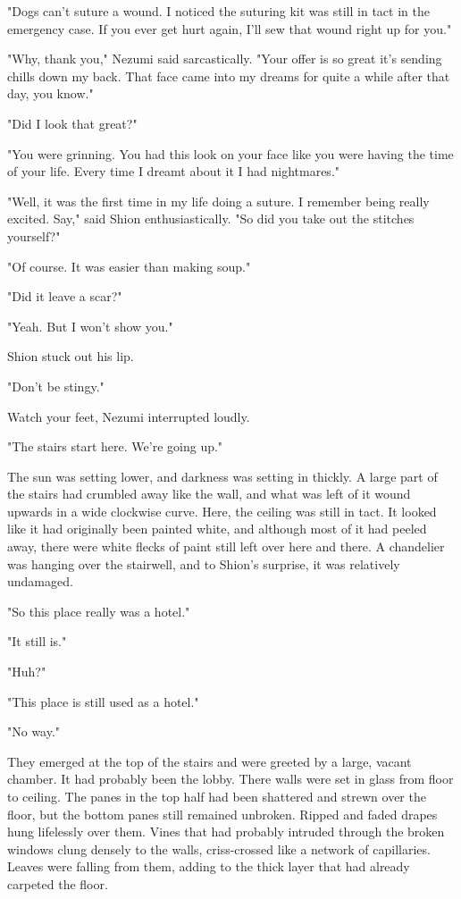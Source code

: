 "Dogs can't suture a wound. I noticed the suturing kit was still in tact
in the emergency case. If you ever get hurt again, I'll sew that wound
right up for you."

"Why, thank you," Nezumi said sarcastically. "Your offer is so great
it's sending chills down my back. That face came into my dreams for
quite a while after that day, you know."

"Did I look that great?"

"You were grinning. You had this look on your face like you were having
the time of your life. Every time I dreamt about it I had nightmares."

"Well, it was the first time in my life doing a suture. I remember being
really excited. Say," said Shion enthusiastically. "So did you take out
the stitches yourself?"

"Of course. It was easier than making soup."

"Did it leave a scar?"

"Yeah. But I won't show you."

Shion stuck out his lip.

"Don't be stingy."

Watch your feet, Nezumi interrupted loudly.

"The stairs start here. We're going up."

The sun was setting lower, and darkness was setting in thickly. A large
part of the stairs had crumbled away like the wall, and what was left of
it wound upwards in a wide clockwise curve. Here, the ceiling was still
in tact. It looked like it had originally been painted white, and
although most of it had peeled away, there were white flecks of paint
still left over here and there. A chandelier was hanging over the
stairwell, and to Shion's surprise, it was relatively undamaged.

"So this place really was a hotel."

"It still is."

"Huh?"

"This place is still used as a hotel."

"No way."

They emerged at the top of the stairs and were greeted by a large,
vacant chamber. It had probably been the lobby. There walls were set in
glass from floor to ceiling. The panes in the top half had been
shattered and strewn over the floor, but the bottom panes still remained
unbroken. Ripped and faded drapes hung lifelessly over them. Vines that
had probably intruded through the broken windows clung densely to the
walls, criss-crossed like a network of capillaries. Leaves were falling
from them, adding to the thick layer that had already carpeted the
floor.

